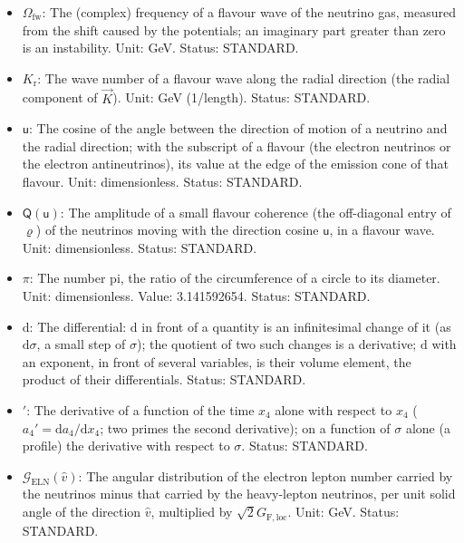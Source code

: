 \documentclass[
  10pt,
]{article}
\providecommand{\tightlist}{%
  \setlength{\itemsep}{0pt}\setlength{\parskip}{0pt}}
\begin{document}
\begin{itemize}
\tightlist
\item
  \(\Omega_{\mathrm{fw}}\): The (complex) frequency of a flavour wave of
  the neutrino gas, measured from the shift caused by the potentials; an
  imaginary part greater than zero is an instability. Unit: GeV. Status:
  STANDARD.
\item
  \(K_{\mathrm{r}}\): The wave number of a flavour wave along the radial
  direction (the radial component of \(\vec K\)). Unit: GeV (1/length).
  Status: STANDARD.
\item
  \(\mathsf{u}\): The cosine of the angle between the direction of
  motion of a neutrino and the radial direction; with the subscript of a
  flavour (the electron neutrinos or the electron antineutrinos), its
  value at the edge of the emission cone of that flavour. Unit:
  dimensionless. Status: STANDARD.
\item
  \(\mathsf{Q}(\mathsf{u})\): The amplitude of a small flavour coherence
  (the off-diagonal entry of \(\varrho\)) of the neutrinos moving with
  the direction cosine \(\mathsf{u}\), in a flavour wave. Unit:
  dimensionless. Status: STANDARD.
\item
  \(\pi\): The number pi, the ratio of the circumference of a circle to
  its diameter. Unit: dimensionless. Value: 3.141592654. Status:
  STANDARD.
\item
  \(\mathrm{d}\): The differential: \(\mathrm{d}\) in front of a
  quantity is an infinitesimal change of it (as \(\mathrm{d}\sigma\), a
  small step of \(\sigma\)); the quotient of two such changes is a
  derivative; \(\mathrm{d}\) with an exponent, in front of several
  variables, is their volume element, the product of their
  differentials. Status: STANDARD.
\item
  \({}'\): The derivative of a function of the time \(x_4\) alone with
  respect to \(x_4\) (\(a_4' = \mathrm{d}a_4/\mathrm{d}x_4\); two primes
  the second derivative); on a function of \(\sigma\) alone (a profile)
  the derivative with respect to \(\sigma\). Status: STANDARD.
\item
  \(\mathcal{G}_{\mathrm{ELN}}(\hat v)\): The angular distribution of
  the electron lepton number carried by the neutrinos minus that carried
  by the heavy-lepton neutrinos, per unit solid angle of the direction
  \(\hat v\), multiplied by \(\sqrt2G_{\mathrm{F,loc}}\). Unit: GeV.
  Status: STANDARD.
\end{itemize}
\end{document}
